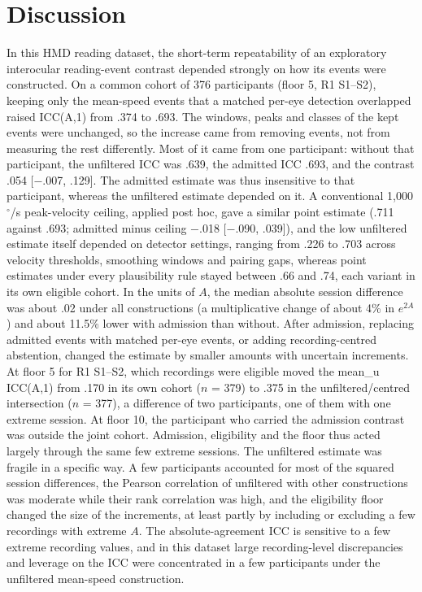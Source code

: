 \section{Discussion}

In this HMD reading dataset, the short-term repeatability of an exploratory interocular reading-event contrast depended strongly on how its events were constructed. On a common cohort of 376 participants (floor 5, R1 S1--S2), keeping only the mean-speed events that a matched per-eye detection overlapped raised ICC(A,1) from .374 to .693. The windows, peaks and classes of the kept events were unchanged, so the increase came from removing events, not from measuring the rest differently. Most of it came from one participant: without that participant, the unfiltered ICC was .639, the admitted ICC .693, and the contrast .054 [$-$.007, .129]. The admitted estimate was thus insensitive to that participant, whereas the unfiltered estimate depended on it. A conventional 1,000$^\circ$/s peak-velocity ceiling, applied post hoc, gave a similar point estimate (.711 against .693; admitted minus ceiling $-$.018 [$-$.090, .039]), and the low unfiltered estimate itself depended on detector settings, ranging from .226 to .703 across velocity thresholds, smoothing windows and pairing gaps, whereas point estimates under every plausibility rule stayed between .66 and .74, each variant in its own eligible cohort. In the units of $A$, the median absolute session difference was about .02 under all constructions (a multiplicative change of about 4\% in $e^{2A}$) and about 11.5\% lower with admission than without. After admission, replacing admitted events with matched per-eye events, or adding recording-centred abstention, changed the estimate by smaller amounts with uncertain increments. At floor 5 for R1 S1--S2, which recordings were eligible moved the mean\_u ICC(A,1) from .170 in its own cohort ($n$ = 379) to .375 in the unfiltered/centred intersection ($n$ = 377), a difference of two participants, one of them with one extreme session. At floor 10, the participant who carried the admission contrast was outside the joint cohort. Admission, eligibility and the floor thus acted largely through the same few extreme sessions. The unfiltered estimate was fragile in a specific way. A few participants accounted for most of the squared session differences, the Pearson correlation of unfiltered with other constructions was moderate while their rank correlation was high, and the eligibility floor changed the size of the increments, at least partly by including or excluding a few recordings with extreme $A$. The absolute-agreement ICC is sensitive to a few extreme recording values, and in this dataset large recording-level discrepancies and leverage on the ICC were concentrated in a few participants under the unfiltered mean-speed construction.

